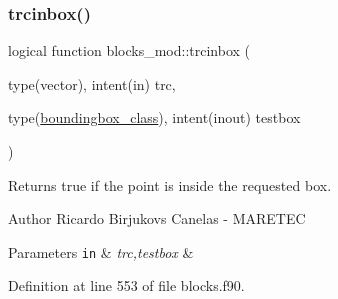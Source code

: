 \mbox{\label{namespaceblocks__mod_ad8d92210b3d4ade090d2a19b97f4c88e}} 
\subsubsection{\texorpdfstring{trcinbox()}{trcinbox()}}
{\footnotesize\ttfamily logical function blocks\+\_\+mod\+::trcinbox (\begin{DoxyParamCaption}\item[{type(vector), intent(in)}]{trc,  }\item[{type(\mbox{\hyperlink{structboundingbox__mod_1_1boundingbox__class}{boundingbox\+\_\+class}}), intent(inout)}]{testbox }\end{DoxyParamCaption})\hspace{0.3cm}{\ttfamily [private]}}



Returns true if the point is inside the requested box. 

\begin{DoxyAuthor}{Author}
Ricardo Birjukovs Canelas -\/ M\+A\+R\+E\+T\+EC 
\end{DoxyAuthor}

\begin{DoxyParams}[1]{Parameters}
\mbox{\tt in}  & {\em trc,testbox} & \\
\hline
\end{DoxyParams}


Definition at line 553 of file blocks.\+f90.


